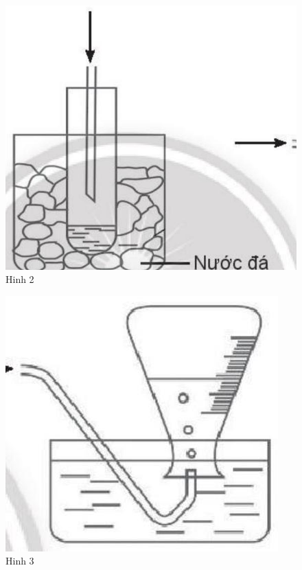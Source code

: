 \documentclass[10pt]{article}
\begin{document}
\begin{figure}[h]
\begin{center}
  \includegraphics[width=\textwidth]{2025_10_23_883c4b146e2332109fcdg-75(2)}
\captionsetup{labelformat=empty}
\caption{Hinh 2}
\end{center}
\end{figure}

\begin{figure}[h]
\begin{center}
  \includegraphics[width=\textwidth]{2025_10_23_883c4b146e2332109fcdg-75}
\captionsetup{labelformat=empty}
\caption{Hinh 3}
\end{center}
\end{figure}
\end{document}
